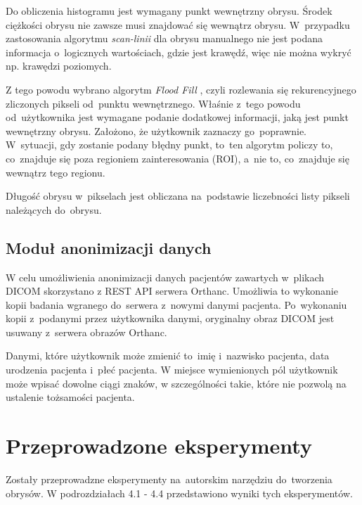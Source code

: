 \documentclass[a4paper,11pt,twoside,openright]{report}
\newcommand\blankpage{%
    \null
    \thispagestyle{empty}%
    \newpage}
\theoremstyle{definition}
\begin{document}
Do obliczenia histogramu jest wymagany punkt wewnętrzny obrysu. Środek ciężkości
obrysu nie zawsze musi znajdować się wewnątrz obrysu. W~przypadku zastosowania
algorytmu \textit{scan-linii} \cite{GK1} dla obrysu manualnego nie jest podana informacja o~logicznych
wartościach, gdzie jest krawędź, więc nie można wykryć np. krawędzi poziomych.

Z tego powodu wybrano algorytm \textit{Flood Fill} \cite{AiSD2}, czyli rozlewania się rekurencyjnego %
zliczonych pikseli od~punktu wewnętrznego. Właśnie z~tego powodu od~użytkownika
jest wymagane podanie dodatkowej informacji, jaką jest punkt wewnętrzny obrysu.
Założono, że użytkownik zaznaczy go~poprawnie. W~sytuacji, gdy zostanie podany
błędny punkt, to~ten algorytm policzy to, co~znajduje się poza regioniem zainteresowania (ROI),
a~nie to, co~znajduje się wewnątrz tego regionu.

Długość obrysu w~pikselach jest obliczana na~podstawie liczebności listy pikseli należących do~obrysu.

\section {Moduł anonimizacji danych}

W celu umożliwienia anonimizacji danych pacjentów zawartych w~plikach DICOM skorzystano
z REST API serwera Orthanc. Umożliwia to wykonanie kopii badania wgranego do~serwera
z~nowymi danymi pacjenta. Po~wykonaniu kopii z~podanymi przez użytkownika danymi,
oryginalny obraz DICOM jest usuwany z~serwera obrazów Orthanc.

Danymi, które użytkownik może zmienić to~imię i~nazwisko pacjenta, data urodzenia pacjenta
i~płeć pacjenta. W miejsce wymienionych pól użytkownik może wpisać dowolne ciągi
znaków, w szczególności takie, które nie pozwolą na ustalenie tożsamości pacjenta.

\afterpage{\blankpage}

\chapter {Przeprowadzone eksperymenty}

Zostały przeprowadzne eksperymenty na~autorskim narzędziu do~tworzenia obrysów.
W podrozdziałach 4.1 - 4.4 przedstawiono wyniki tych eksperymentów.
\end{document}
